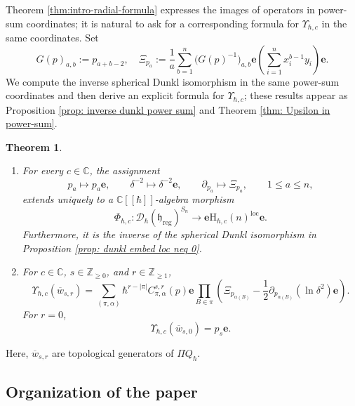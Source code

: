 \documentclass[11pt,reqno]{amsart}
\newtheorem{theorem}{Theorem}[section]
\theoremstyle{definition}
\newcommand{\bbC}{\mathbb{C}}
\newcommand{\bbZ}{\mathbb{Z}}
\newcommand{\be}{\mathbf{e}}
\newcommand{\mD}{\mathcal{D}}
\newcommand{\rmH}{\mathrm{H}}
\newcommand{\fkh}{\mathfrak{h}}
\newcommand{\reg}{\mathrm{reg}}
\newcommand{\loc}{{\mathrm{loc}}}
\begin{document}
Theorem
\ref{thm:intro-radial-formula} expresses the images of operators in power-sum coordinates;
it is natural to ask for a corresponding formula for \(\Upsilon_{\hbar,c}\)
in the same coordinates.
Set
\[
G(p)_{a,b}:=p_{a+b-2}, \quad \Xi_{p_a}
:=
\frac1a\sum_{b=1}^n
\bigl(G(p)^{-1}\bigr)_{a,b}
\be\left(\sum_{i=1}^n x_i^{b-1}y_i\right)\be.
\]
We compute the inverse spherical Dunkl isomorphism in the same power-sum coordinates and then derive an explicit formula for \(\Upsilon_{\hbar, c}\); these results appear as Proposition \ref{prop: inverse dunkl power sum} and Theorem \ref{thm: Upsilon in power-sum}.

\begin{theorem}
	\begin{enumerate}
		\item For every \(c\in\bbC\), the assignment
		\begin{equation*}
			p_a\mapsto p_a\be,
			\qquad
			\delta^{-2}\mapsto\delta^{-2}\be,
			\qquad
			\partial_{p_a}\mapsto\Xi_{p_a},
			\qquad 1\leq a\leq n,
		\end{equation*}
		extends uniquely to a  \(\bbC[[\hbar]]\)-algebra morphism
		\[
		\Phi_{\hbar,c}:
		\mD_\hbar(\fkh_{\reg})^{S_n}
		\longrightarrow
		\be\rmH_{\hbar,c}(n)^\loc\be.
		\]
Furthermore, it is the inverse of the spherical Dunkl isomorphism in Proposition \ref{prop: dunkl embed loc neq 0}.

\item For \(c\in\bbC\), \(s\in\bbZ_{\geq0}\), and
\(r\in\bbZ_{\geq1}\),
\begin{equation*}
\Upsilon_{\hbar,c}(\overline w_{s,r})
=\sum_{(\pi,\alpha)}
			\hbar^{r-|\pi|}C_{\pi,\alpha}^{s,r}(p)\be
			\prod_{B\in\pi}
			\left(
			\Xi_{p_{\alpha(B)}}
			-
			\frac{1}{2}
			\partial_{p_{\alpha(B)}}(\ln \delta^2)\be
			\right).
\end{equation*}
For \(r=0\),
\[
\Upsilon_{\hbar,c}(\overline w_{s,0})
=p_s\be.
\]
\end{enumerate}
\end{theorem}
Here, \(\overline w_{s,r}\)
are topological generators of \(\Pi Q_{\hbar}\).




\subsection{Organization
of the paper}
\end{document}
